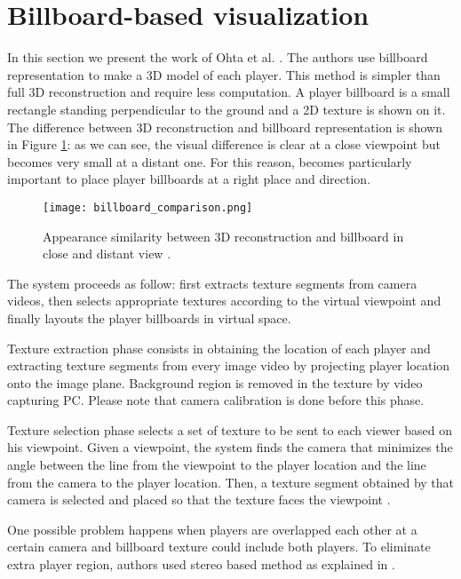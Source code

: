 \section{Billboard-based visualization}
In this section we present the work of Ohta et al. \cite{03_billboard}.
The authors use billboard representation to make a 3D model of each player.
This method is simpler than full 3D reconstruction and require less computation.
A player billboard is a small rectangle standing perpendicular to the ground
and a 2D texture is shown on it.
The difference between 3D reconstruction and billboard representation is shown in Figure \ref{fig:billboard_comparison}:
as we can see, the visual difference is clear at a close viewpoint but becomes very small at a distant one.
For this reason, becomes particularly important to place player billboards at a right place and direction.

\begin{figure}[htbp]
\centerline{\texttt{[image: billboard\_comparison.png]}}
\caption{Appearance similarity between 3D reconstruction and billboard in close and distant view \cite{03_billboard}.}
\label{fig:billboard_comparison}
\end{figure}


The system proceeds as follow: first extracts texture segments from camera videos, then selects appropriate textures according
to the virtual viewpoint and finally layouts the player billboards in virtual space.

Texture extraction phase consists in obtaining the location of each player and extracting texture segments from every image 
video by projecting player location onto the image plane.
Background region is removed in the texture by video capturing PC.
Please note that camera calibration is done before this phase.

Texture selection phase selects a set of texture to be sent to each viewer based on his viewpoint. 
Given a viewpoint, the system finds the camera that minimizes the angle between the line from the viewpoint to the player 
location and the line from the camera to the player location. Then, a texture segment obtained by that camera is selected 
and placed so that the texture faces the viewpoint \cite{03_billboard}.


One possible problem happens when players are overlapped each other at a certain camera and billboard texture could include both
players.
To eliminate extra player region, authors used stereo based method \cite{03_billboard_04} as explained in \cite{03_billboard}. 

